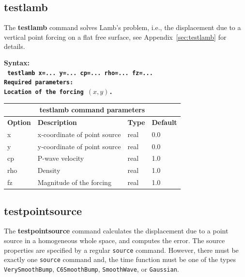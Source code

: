 \documentclass[11pt]{report}
\begin{document}
{%
\subsection{testlamb}
\label{keyword:testlamb}
The {\bf testlamb} command solves Lamb's problem, i.e., the displacement due to a vertical point
forcing on a flat free surface, see Appendix~\ref{sec:testlamb} for details.
\begin{flushleft}
	\bf
	Syntax:\\
	\tt
	testlamb x=... y=... cp=... rho=... fz=...
	\\
	\bf Required parameters:\\
	\rm Location of the forcing $(x, y)$.
\end{flushleft}
%
\begin{center}
	\begin{tabular}{|l|p{8cm}|l|l|} \hline
		\multicolumn{4}{|c|}{\bf testlamb command  parameters}                \\ \hline
		\bf{Option} & \bf{Description}             & \bf{Type} & \bf{Default} \\ \hline \hline
		x           & x-coordinate of point source & real      & 0.0          \\ \hline
		y           & y-coordinate of point source & real      & 0.0          \\ \hline
		cp          & P-wave velocity              & real      & 1.0          \\ \hline
		rho         & Density                      & real      & 1.0          \\ \hline
		fz          & Magnitude of the forcing     & real      & 1.0          \\ \hline
	\end{tabular}
\end{center}

\subsection{testpointsource}
\label{keyword:pointsource}
The {\bf testpointsource} command calculates the displacement due to a point source in a homogeneous
whole space, and computes the error. The source properties are specified by a regular \verb+source+
command. However, there must be exactly one \verb+source+ command and, the time function must be
one of the types \verb+VerySmoothBump+, \verb+C6SmoothBump+, \verb+SmoothWave+, or \verb+Gaussian+.

}
\end{document}
